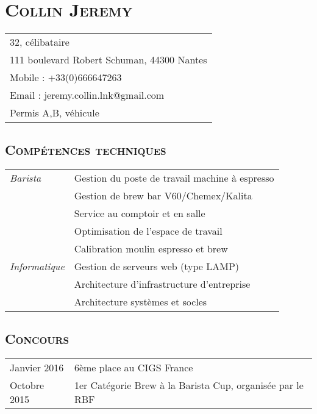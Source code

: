\documentclass[a4paper]{article}
\newcommand{\hsection}[1]{\section*{\fontfamily{phv}\selectfont\textsc{#1}}}
\newcommand{\hsubsection}[1]{\subsection*{\fontfamily{phv}\selectfont\textsc{#1}}}
\begin{document}
\selectfont
\hsection{Collin Jeremy}
\begin{tabular}{p{16.5cm}}
\hline
32, célibataire\\
111 boulevard Robert Schuman, 44300 Nantes\\
Mobile : +33(0)666647263\\
Email : jeremy.collin.lnk@gmail.com\\
Permis A,B, véhicule\\
\end{tabular}
\hsubsection{Compétences techniques}
\begin{tabular}{P{3.5cm}|p{13cm}}
\textsl{Barista}	& Gestion du poste de travail machine à espresso\\
 & Gestion de brew bar V60/Chemex/Kalita\\
 & Service au comptoir et en salle\\
 & Optimisation de l’espace de travail\\
 & Calibration moulin espresso et brew\\

\textsl{Informatique}	& Gestion de serveurs web (type LAMP)\\
			& Architecture d’infrastructure d’entreprise \\
			& Architecture systèmes et socles\\
\end{tabular}

\hsubsection{Concours}
\begin{tabular}{P{3.5cm}|p{13cm}}
Janvier 2016	& 6ème place au CIGS France\\
Octobre 2015	& 1er Catégorie Brew à la Barista Cup, organisée par le RBF\\
\end{tabular}
\end{document}
